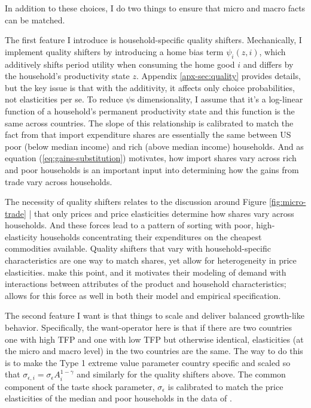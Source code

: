 \documentclass[12pt,pdftex]{article}
\begin{document}
\begin{onehalfspacing}
In addition to these choices, I do two things to ensure that micro and macro facts can be matched.

The first feature I introduce is household-specific quality shifters. Mechanically, I implement quality shifters by introducing a home bias term $\psi_{i}(z,i)$, which additively shifts period utility when consuming the home good $i$ and differs by the household's productivity state $z$. Appendix \ref{apx-sec:quality} provides details, but the key issue is that with the additivity, it affects only choice probabilities, not elasticities per se. To reduce $\psi$s dimensionality, I assume that it's a log-linear function of a household's permanent productivity state and this function is the same across countries. The slope of this relationship is calibrated to match the fact from \citet{borusyak2021distributional} that import expenditure shares are essentially the same between US poor (below median income) and rich (above median income) households. And as equation (\ref{eq:gains-substitution}) motivates, how import shares vary across rich and poor households is an important input into determining how the gains from trade vary across households.

The necessity of quality shifters relates to the discussion around Figure \ref{fig:micro-trade} | that only prices and price elasticities determine how shares vary across households. And these forces lead to a pattern of sorting with poor, high-elasticity households concentrating their expenditures on the cheapest commodities available. Quality shifters that vary with household-specific characteristics are one way to match shares, yet allow for heterogeneity in price elasticities. \citet{berry1995automobile} make this point, and it motivates their modeling of demand with interactions between attributes of the product and household characteristics; \citet{auer2022unequal} allows for this force as well in both their model and empirical specification.

The second feature I want is that things to scale and deliver balanced growth-like behavior. Specifically, the want-operator here is that if there are two countries one with high TFP and one with low TFP but otherwise identical, elasticities (at the micro and macro level) in the two countries are the same. The way to do this is to make the Type 1 extreme value parameter country specific and scaled so that $\sigma_{\epsilon,i} = \sigma_{\epsilon} A_i^{1-\gamma}$ and similarly for the quality shifters above. The common component of the taste shock parameter, $\sigma_{\epsilon}$ is calibrated to match the price elasticities of the median and poor households in the data of \citet{auer2022unequal}.


\end{onehalfspacing}
\end{document}
